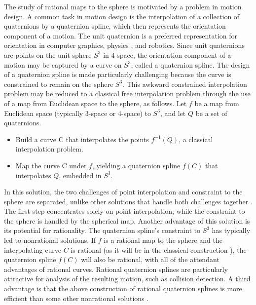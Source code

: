 \documentclass[12pt]{article}
\begin{document}
The study of rational maps to the sphere is motivated by a problem in motion design.
A common task in motion design is the interpolation of a collection of quaternions
by a quaternion spline, which then represents the orientation component of a motion.
The unit quaternion is a preferred representation for orientation
in computer graphics, physics \cite{misner}, and robotics.
Since unit quaternions are points on the unit sphere $S^3$ in 4-space, 
the orientation component of a motion may be captured by a curve on $S^3$, called
a quaternion spline.
The design of a quaternion spline is made particularly challenging because 
the curve is constrained to remain on the sphere $S^3$.
This awkward constrained interpolation problem may be reduced to 
a classical free interpolation problem through the use of a map from Euclidean space 
to the sphere, as follows.
Let $f$ be a map from Euclidean space (typically 3-space or 4-space) to $S^3$,
and let $Q$ be a set of quaternions.

\begin{itemize}
\item Build a curve C that interpolates the points $f^{-1}(Q)$, a classical
      interpolation problem.
\item Map the curve C under $f$, yielding a quaternion spline $f(C)$ 
      that interpolates $Q$, embedded in $S^3$.
\end{itemize}

In this solution, the two challenges of point interpolation and
constraint to the sphere are separated,
unlike other solutions that handle both challenges together \cite{animationtext}.
The first step concentrates solely on point interpolation,
while the constraint to the sphere is handled by the spherical map.
Another advantage of this solution is its potential for rationality.
The quaternion spline's constraint to $S^3$ has typically led to nonrational solutions.
If $f$ is a rational map to the sphere
and the interpolating curve $C$ is rational (as it will be in the 
classical construction \cite{farin}),
the quaternion spline $f(C)$ will also be rational, with all of the 
attendant advantages of rational curves.
Rational quaternion splines are particularly attractive for analysis of the 
resulting motion, such as collision detection.
A third advantage is that the above construction of rational quaternion splines 
is more efficient than some other nonrational solutions \cite{barr92,barrafter92}.
\end{document}
